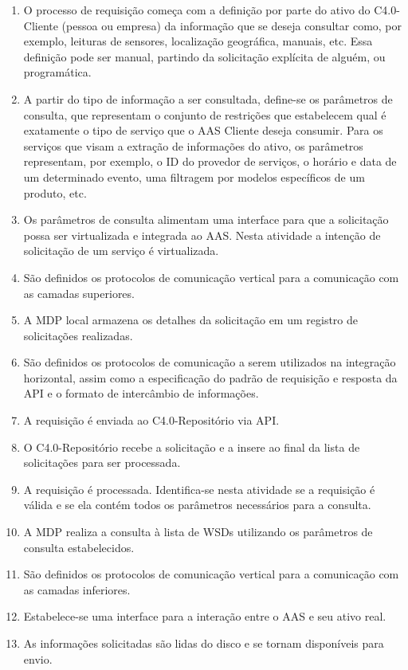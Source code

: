 	\begin{enumerate}
		
		\item O processo de requisição começa com a definição por parte do ativo do C4.0-Cliente (pessoa ou empresa) da informação que se deseja consultar como, por exemplo, leituras de sensores, localização geográfica, manuais, etc. Essa definição pode ser manual, partindo da solicitação explícita de alguém, ou programática.
		
		\item A partir do tipo de informação a ser consultada, define-se os parâmetros de consulta, que representam o conjunto de restrições que estabelecem qual é exatamente o tipo de serviço que o AAS Cliente deseja consumir. Para os serviços que visam a extração de informações do ativo, os parâmetros representam, por exemplo, o ID do provedor de serviços, o horário e data de um determinado evento, uma filtragem por modelos específicos de um produto, etc.
		
		\item Os parâmetros de consulta alimentam uma interface para que a solicitação possa ser virtualizada e integrada ao AAS. Nesta atividade a intenção de solicitação de um serviço é virtualizada.
		
		\item São definidos os protocolos de comunicação vertical para a comunicação com as camadas superiores.
		
		\item A MDP local armazena os detalhes da solicitação em um registro de solicitações realizadas.
		
		\item São definidos os protocolos de comunicação a serem utilizados na integração horizontal, assim como a especificação do padrão de requisição e resposta da API e o formato de intercâmbio de informações.
		
		\item A requisição é enviada ao C4.0-Repositório via API.
		
		\item O C4.0-Repositório recebe a solicitação e a insere ao final da lista de solicitações para ser processada.
		
		\item A requisição é processada. Identifica-se nesta atividade se a requisição é válida e se ela contém todos os parâmetros necessários para a consulta.
		
		\item A MDP realiza a consulta à lista de WSDs utilizando os parâmetros de consulta estabelecidos.
		
		\item São definidos os protocolos de comunicação vertical para a comunicação com as camadas inferiores.
		
		\item Estabelece-se uma interface para a interação entre o AAS e seu ativo real.
		
		\item As informações solicitadas são lidas do disco e se tornam disponíveis para envio.
	\end{enumerate}


